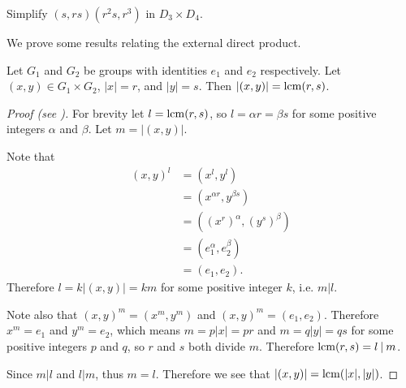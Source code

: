 \begin{exercise}
    Simplify $(s, rs)(r^2s, r^3)$ in $D_3 \times D_4$.
\end{exercise}

We prove some results relating the external direct product.
\begin{proposition}\label{prop-order-of-element-in-external-direct-product}
    Let $G_1$ and $G_2$ be groups with identities $e_1$ and $e_2$ respectively. Let $(x, y) \in G_1 \times G_2$, $|x| = r$, and $|y| = s$. Then $|(x, y)| = \mathrm{lcm}(r, s)$.
\end{proposition}
\begin{proof}[Proof (see \cite{proofwiki_order-of-group-element-in-external-direct-product})]
    For brevity let $l = \mathrm{lcm}(r, s)$, so $l = \alpha r = \beta s$ for some positive integers $\alpha$ and $\beta$. Let $m = |(x, y)|$.

    Note that
    \begin{align*}
        (x, y)^l &= (x^l, y^l)\\
        &= (x^{\alpha r}, y^{\beta s})\\
        &= \left((x^r)^\alpha, (y^s)^\beta\right)\\
        &= (e_1^\alpha, e_2^\beta)\\
        &= (e_1, e_2).
    \end{align*}
    Therefore $l = k|(x, y)| = km$ for some positive integer $k$, i.e. $m\vert l$.

    Note also that $(x, y)^m = (x^m, y^m)$ and $(x, y)^m = (e_1, e_2)$. Therefore $x^m = e_1$ and $y^m = e_2$, which means $m = p|x| = pr$ and $m = q|y| = qs$ for some positive integers $p$ and $q$, so $r$ and $s$ both divide $m$. Therefore $\lcm(r, s) = l\vert m$.

    Since $m\vert l$ and $l\vert m$, thus $m = l$. Therefore we see that $|(x, y)| = \mathrm{lcm}(|x|, |y|)$.
\end{proof}

